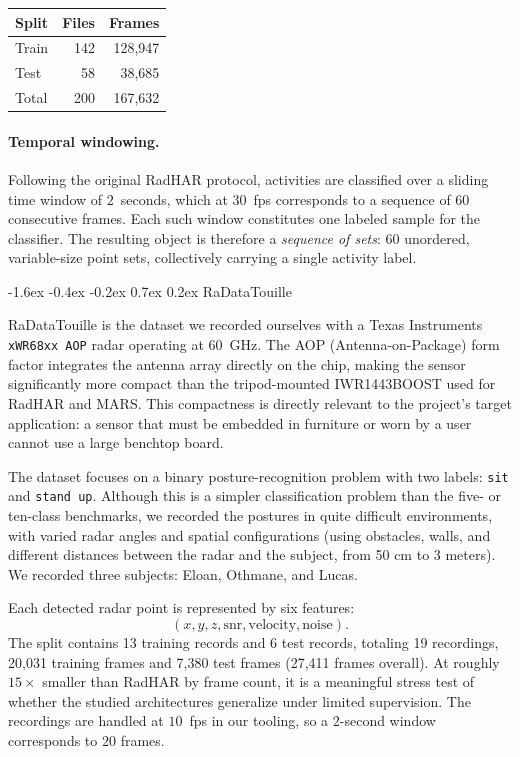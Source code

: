\documentclass[10pt,twocolumn]{article}
\makeatletter
\renewcommand{\subsection}{%
  \@startsection{subsection}{2}{\z@}%
  {-1.6ex \@plus -0.4ex \@minus -0.2ex}%
  {0.7ex \@plus 0.2ex}%
  {\normalfont\normalsize\bfseries}}
\makeatother
\begin{document}
\begin{center}
\begin{tabular}{lrr}
\toprule
Split & Files & Frames \\
\midrule
Train & 142 & 128,947 \\
Test & 58 & 38,685 \\
Total & 200 & 167,632 \\
\bottomrule
\end{tabular}
\end{center}

\paragraph{Temporal windowing.}
Following the original RadHAR protocol, activities are classified over a
sliding time window of $2$~seconds, which at $30$~fps corresponds to a
sequence of $60$ consecutive frames. Each such window constitutes one
labeled sample for the classifier. The resulting object is therefore a
\emph{sequence of sets}: 60 unordered, variable-size point sets,
collectively carrying a single activity label.


\subsection{RaDataTouille}
\label{sec:radatatouille}

RaDataTouille is the dataset we recorded ourselves with a Texas Instruments
\texttt{xWR68xx AOP} radar operating at 60~GHz. The AOP (Antenna-on-Package)
form factor integrates the antenna array directly on the chip, making the
sensor significantly more compact than the tripod-mounted IWR1443BOOST used
for RadHAR and MARS. This compactness is directly relevant to the project's
target application: a sensor that must be embedded in furniture or worn by
a user cannot use a large benchtop board.

The dataset focuses on a binary posture-recognition problem with two labels:
\texttt{sit} and \texttt{stand~up}. Although this is a simpler classification
problem than the five- or ten-class benchmarks, we recorded the postures in quite difficult environments,
with varied radar angles and spatial configurations (using obstacles, walls, and 
different distances between the radar and the subject, from 50 cm to 3 meters). We recorded
three subjects: Eloan, Othmane, and Lucas.

Each detected radar point is represented by six features:
\[
(x, y, z, \mathrm{snr}, \mathrm{velocity}, \mathrm{noise}).
\]
The split contains 13 training records and 6 test records, totaling 19
recordings, 20,031 training frames and 7,380 test frames (27,411 frames
overall). At roughly $15\times$ smaller than RadHAR by frame count, it is a
meaningful stress test of whether the studied architectures generalize under
limited supervision. The recordings are handled at $10$~fps in our tooling, so
a $2$-second window corresponds to $20$ frames.
\end{document}
